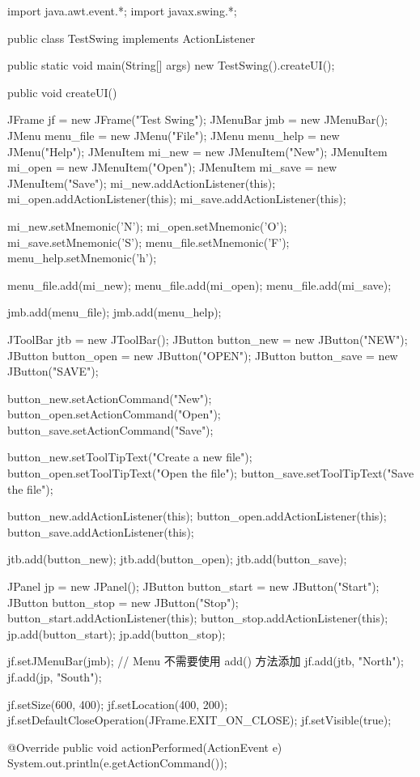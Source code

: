 \begin{javaCode}
  import java.awt.event.*;
  import javax.swing.*;

  public class TestSwing implements ActionListener {
    public static void main(String[] args) {
      new TestSwing().createUI();
    }

    public void createUI() {
      JFrame jf = new JFrame("Test Swing");
      JMenuBar jmb = new JMenuBar();
      JMenu menu_file = new JMenu("File");
      JMenu menu_help = new JMenu("Help");
      JMenuItem mi_new = new JMenuItem("New");
      JMenuItem mi_open = new JMenuItem("Open");
      JMenuItem mi_save = new JMenuItem("Save");
      mi_new.addActionListener(this);
      mi_open.addActionListener(this);
      mi_save.addActionListener(this);

      mi_new.setMnemonic('N');
      mi_open.setMnemonic('O');
      mi_save.setMnemonic('S');
      menu_file.setMnemonic('F');
      menu_help.setMnemonic('h');
      
      menu_file.add(mi_new);
      menu_file.add(mi_open);
      menu_file.add(mi_save);
      
      jmb.add(menu_file);
      jmb.add(menu_help);

      JToolBar jtb = new JToolBar();
      JButton button_new = new JButton("NEW");
      JButton button_open = new JButton("OPEN");
      JButton button_save = new JButton("SAVE");

      button_new.setActionCommand("New");
      button_open.setActionCommand("Open");
      button_save.setActionCommand("Save");


      button_new.setToolTipText("Create a new file");
      button_open.setToolTipText("Open the file");
      button_save.setToolTipText("Save the file");
      
      button_new.addActionListener(this);
      button_open.addActionListener(this);
      button_save.addActionListener(this);
      
      jtb.add(button_new);
      jtb.add(button_open);
      jtb.add(button_save);
      
      JPanel jp = new JPanel();
      JButton button_start = new JButton("Start");
      JButton button_stop = new JButton("Stop");
      button_start.addActionListener(this);
      button_stop.addActionListener(this);
      jp.add(button_start);
      jp.add(button_stop);

      jf.setJMenuBar(jmb); // Menu 不需要使用 add() 方法添加
      jf.add(jtb, "North");
      jf.add(jp, "South");
      
      jf.setSize(600, 400);
      jf.setLocation(400, 200);
      jf.setDefaultCloseOperation(JFrame.EXIT_ON_CLOSE);
      jf.setVisible(true);
    }

    @Override
    public void actionPerformed(ActionEvent e) {
      System.out.println(e.getActionCommand());
    }
  }
\end{javaCode}

